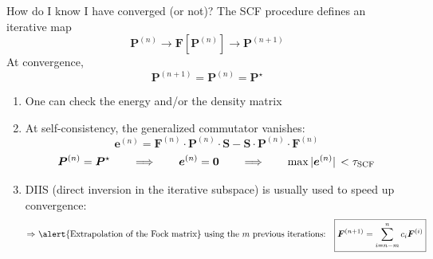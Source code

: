 \documentclass[aspectratio=169,9pt]{beamer}
\newcommand{\bP}{\boldsymbol{P}}
\newcommand{\bO}{\boldsymbol{0}}
\newcommand{\bS}{\boldsymbol{S}}
\newcommand{\bF}{\boldsymbol{F}}
\newcommand{\be}{\boldsymbol{e}}
\begin{document}
\begin{frame}{How do I know I have converged (or not)?}
	The SCF procedure defines an iterative map
	\begin{equation*}
		\boxed{
			\bP^{(n)}
			\longrightarrow
			\bF[\bP^{(n)}]
			\longrightarrow
			\bP^{(n+1)}
		}
	\end{equation*}
	At convergence,
	\begin{equation*}
		\bP^{(n+1)}=\bP^{(n)}=\bP^\star
	\end{equation*}

	\begin{enumerate}
		\item One can check the \alert{energy and/or the density matrix}
		\item At self-consistency, the \alert{generalized commutator} vanishes:
    	\begin{equation*}
    		\boxed{
    			\be^{(n)}
    			=
    			\bF^{(n)} \cdot \bP^{(n)} \cdot \bS
    			-
    			\bS \cdot \bP^{(n)} \cdot \bF^{(n)}
    		}
    	\end{equation*}
    	\begin{equation*}
    		\bP^{(n)}=\bP^\star
    		\qquad\Longrightarrow\qquad
    		\be^{(n)}=\bO
    		\qquad\Longrightarrow\qquad
    		\max \abs*{\be^{(n)}} < \tau_\text{SCF}
    	\end{equation*}

		\item \alert{DIIS (direct inversion in the iterative subspace)} is usually used to speed up convergence:\\
		\begin{equation*}
			\qq*{$\Rightarrow$ \alert{Extrapolation of the Fock matrix} using the $m$ previous iterations:}
			\boxed{\bF^{(n+1)} = \sum_{i=n-m}^{n} c_i \bF^{(i)}}
		\end{equation*}
	\end{enumerate}
\end{frame}

\end{document}
